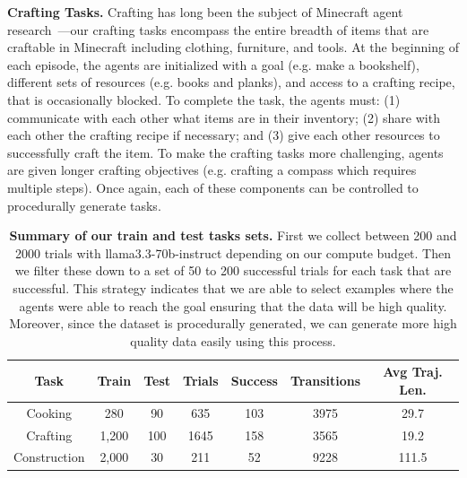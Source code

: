 \documentclass{article}
\begin{document}
\textbf{Crafting Tasks.} 
Crafting has long been the subject of Minecraft agent research~\citep{kanervisto2022minerl}---our crafting tasks encompass the entire breadth of items that are craftable in Minecraft including clothing, furniture, and tools.  
At the beginning of each episode, the agents are initialized with a goal (e.g. make a bookshelf), different sets of resources (e.g. books and planks), and access to a crafting recipe, that is occasionally blocked.
To complete the task, the agents must: (1) communicate with each other what items are in their inventory; (2) share with each other the crafting recipe if necessary; and (3) give each other resources to successfully craft the item.
To make the crafting tasks more challenging, agents are given longer crafting objectives (e.g. crafting a compass which requires multiple steps).
Once again, each of these components can be controlled to procedurally generate tasks.
\begin{table}
\centering
\begin{tabular}{@{}ccccccc@{}}
\toprule
\textbf{Task}             & Train & Test & Trials & Success & Transitions & Avg Traj. Len.\\ 
             \midrule
Cooking      & 280  & 90  & 635  & 103 & 3975 & 29.7  \\
Crafting     & 1,200  & 100 & 1645  & 158  & 3565  &  19.2 \\
Construction & 2,000  & 30  & 211 & 52 & 9228 & 111.5  \\                                                                 \bottomrule
\end{tabular}
\caption{\textbf{Summary of our train and test tasks sets.} First we collect between 200 and 2000 trials with llama3.3-70b-instruct depending on our compute budget. Then we filter these down to a set of 50 to 200 successful trials for each task that are successful. This strategy indicates that we are able to select examples where the agents were able to reach the goal ensuring that the data will be high quality. Moreover, since the dataset is procedurally generated, we can generate more high quality data easily using this process.}
\label{tab:dataset-table}
\end{table}
\end{document}
